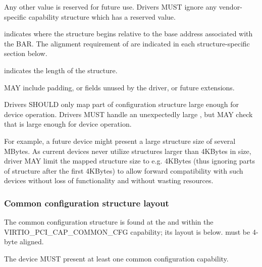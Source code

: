 \begin{description}
        Any other value is reserved for future use. Drivers MUST
        ignore any vendor-specific capability structure which has
        a reserved  value.

\item[\field{offset}]
        indicates where the structure begins relative to the base address associated
        with the BAR.  The alignment requirement of  are indicated
        in each structure-specific section below.

\item[\field{length}]
        indicates the length of the structure.

         MAY include padding, or fields unused by the driver, or
        future extensions.

        Drivers SHOULD only map part of configuration structure
        large enough for device operation.  Drivers MUST handle
        an unexpectedly large , but MAY check that 
        is large enough for device operation.

        For example, a future device might present a large structure size of several
        MBytes.
        As current devices never utilize structures larger than 4KBytes in size,
        driver MAY limit the mapped structure size to e.g.
        4KBytes (thus ignoring parts of structure after the first
        4KBytes) to allow forward compatibility with such devices without loss of
        functionality and without wasting resources.
\end{description}

\subsubsection{Common configuration structure layout}\label{sec:Virtio Transport Options / Virtio Over PCI Bus / PCI Device Layout / Common configuration structure layout}

The common configuration structure is found at the  and  within the VIRTIO_PCI_CAP_COMMON_CFG capability; its layout is below.
 must be 4-byte aligned.

The device MUST present at least one common configuration capability.


